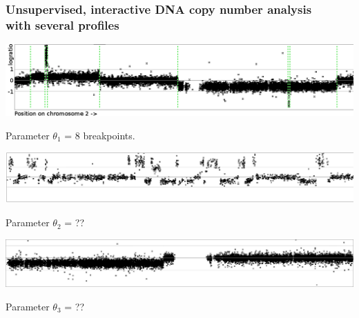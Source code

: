 \documentclass{beamer}
\begin{document}
\begin{frame}
  \frametitle{Unsupervised, interactive DNA copy number analysis\\
  with several profiles}
  \includegraphics[width=\textwidth]{unlabeled-breakpoints-8}

  Parameter $\theta_1$ = 8 breakpoints.

  \vskip 0.1in

  \includegraphics[width=\textwidth]{lots-of-breaks}

  Parameter $\theta_2$ = ??

  \vskip 0.1in

  \includegraphics[width=\textwidth]{only-one-break}

  Parameter $\theta_3$ = ??

\end{frame}
\end{document}
